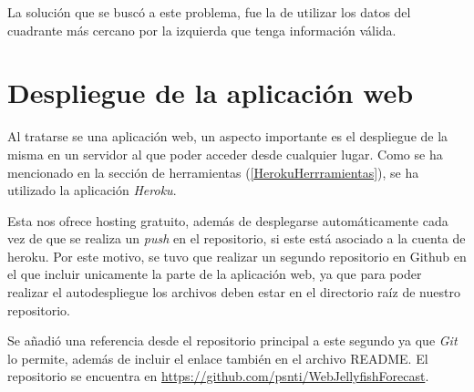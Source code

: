 La solución que se buscó a este problema, fue la de utilizar los datos del cuadrante más cercano por la izquierda que tenga información válida.

\section{Despliegue de la aplicación web}
Al tratarse se una aplicación web, un aspecto importante es el despliegue de la misma en un servidor al que poder acceder desde cualquier lugar. Como se ha mencionado en la sección de herramientas (\ref{HerokuHerrramientas}), se ha utilizado la aplicación \emph{Heroku}.

Esta nos ofrece hosting gratuito, además de desplegarse automáticamente cada vez de que se realiza un \emph{push} en el repositorio, si este está asociado a la cuenta de heroku. Por este motivo, se tuvo que realizar un segundo repositorio en Github en el que incluir unicamente la parte de la aplicación web, ya que para poder realizar el autodespliegue los archivos deben estar en el directorio raíz de nuestro repositorio.

Se añadió una referencia desde el repositorio principal a este segundo ya que \emph{Git} lo permite, además de incluir el enlace también en el archivo README. El repositorio se encuentra en \href{https://github.com/psnti/WebJellyfishForecast}{https://github.com/psnti/WebJellyfishForecast}.


